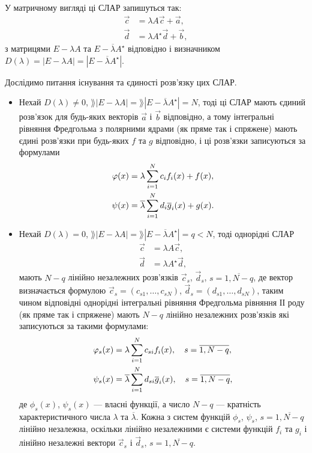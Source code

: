 \begin{remark}
	У матричному вигляді ці СЛАР запишуться так:
	\begin{align}
		\vec c &= \lambda A \vec c + \vec a, \\
		\vec d &= \lambda A^\star  \vec d + \vec b,
	\end{align}
	з матрицями $E - \lambda A$ та $E - \overline \lambda A^\star $ відповідно і визначником $D(\lambda) = |E - \lambda A| = |E - \overline \lambda A^\star |$.
\end{remark}

Дослідимо питання існування та єдиності розв'язку цих СЛАР. \medskip

\begin{itemize}
	\item Нехай $D(\lambda) \ne 0$, $\rang |E - \lambda A| = \rang \left|E - \overline \lambda A^\star\right| = N$, тоді ці СЛАР мають єдиний розв'язок для будь-яких векторів $\vec a$ і $\vec b$ відповідно, а тому інтегральні рівняння Фредгольма з полярними ядрами (як пряме так і спряжене) мають єдині розв'язки при будь-яких $f$ та $g$ відповідно, і ці розв'язки записуються за формулами 
	\begin{align}
		\varphi(x) &= \lambda \displaystyle\sum\limits_{i = 1}^N c_i f_i(x) + f(x), \\
		\psi(x) &= \overline \lambda \displaystyle\sum\limits_{i = 1}^N d_i \overline g_i(x) + g(x).
	\end{align}

	\item Нехай $D(\lambda) = 0$, $\rang |E - \lambda A| = \rang \left|E - \overline \lambda A^\star\right| = q < N$, тоді однорідні СЛАР 
	\begin{align}
		\vec c &= \lambda A \vec c, \\
		\vec d &= \lambda A^\star \vec d,
	\end{align}
	мають $N - q$ лінійно незалежних розв'язків $\vec c_s$, $\vec d_s$, $s = \overline{1, N - q}$, де вектор визначається формулою $\vec c_s = (c_{s1}, \ldots, c_{sN})$, $\vec d_s = (d_{s1}, \ldots, d_{sN})$, таким чином відповідні однорідні інтегральні рівняння Фредгольма рівняння ІІ роду (як пряме так і спряжене) мають $N - q$ лінійно незалежних розв'язків які записуються за такими формулами:
	\begin{align}
		\varphi_s(x) &= \lambda \displaystyle\sum\limits_{i = 1}^N c_{si} f_i(x), \quad s = \overline{1, N - q}, \\
		\psi_s(x) &= \overline \lambda \displaystyle\sum\limits_{i = 1}^N d_{si} \overline g_i(x), \quad s = \overline{1, N - q},
	\end{align}
	де $\phi_s(x)$, $\psi_s(x)$ --- власні функції, а число $N - q$ --- кратність характеристичного числа $\lambda$ та $\overline \lambda$. Кожна з систем функцій $\phi_s$, $\psi_s$, $s = \overline{1, N - q}$ лінійно незалежна, оскільки лінійно незалежними є системи функцій $f_i$ та $g_i$ і лінійно незалежні вектори $\vec c_s$ і $\vec d_s$, $s = \overline{1, N - q}$.


\end{itemize}
